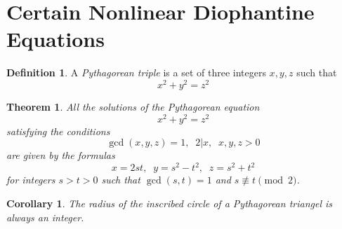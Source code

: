 \documentclass{article}
\newtheorem{theorem}{Theorem}[section]
\newtheorem{corollary}{Corollary}[theorem]
\theoremstyle{remark}
\theoremstyle{definition}
\newtheorem{definition}{Definition}[section]
\begin{document}
\section{Certain Nonlinear Diophantine Equations}

\begin{definition}
A \textit{Pythagorean triple} is a set of three integers $x, y, z$ such that 
\[x^2 + y^2 = z^2\]
\end{definition}

\begin{theorem}
All the solutions of the Pythagorean equation
\[x^2 + y^2 = z^2\]
satisfying the conditions 
\[\gcd(x, y, z) = 1, \;\; 2 \big| x, \;\; x, y, z > 0\]
are given by the formulas 
\[x = 2st, \;\; y = s^2 - t^2, \;\; z= s^2 + t^2\]
for integers $s > t > 0$ such that $\gcd(s, t) = 1$ and $s \not\equiv t \pmod{2}$. 
\end{theorem}

\begin{corollary}
The radius of the inscribed circle of a Pythagorean triangel is always an integer. 
\end{corollary}
\end{document}
